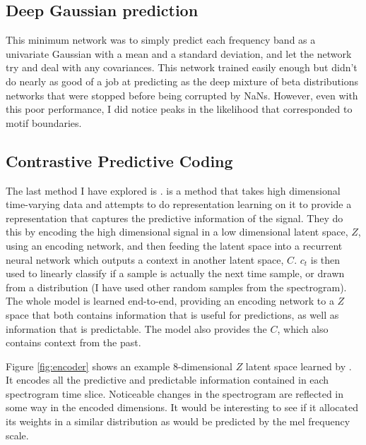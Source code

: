 \subsection{Deep Gaussian prediction}
This minimum network was to simply predict each frequency band as a univariate Gaussian with a mean and a standard deviation, and let the network try and deal with any covariances. This network trained easily enough but didn't do nearly as good of a job at predicting as the deep mixture of beta distributions networks that were stopped before being corrupted by NaNs. However, even with this poor performance, I did notice peaks in the likelihood that corresponded to motif boundaries.

\subsection{Contrastive Predictive Coding}
The last method I have explored is \CPC\cite{CPC}. \CPC is a method that takes high dimensional time-varying data and attempts to do representation learning on it to provide a representation that captures the predictive information of the signal. They do this by encoding the high dimensional signal in a low dimensional latent space, $Z$, using an encoding network, and then feeding the latent space into a recurrent neural network which outputs a context in another latent space, $C$. $c_t$ is then used to linearly classify if a sample is actually the next time sample, or drawn from a distribution (I have used other random samples from the spectrogram). The whole model is learned end-to-end, providing an encoding network to a $Z$ space that both contains information that is useful for predictions, as well as information that is predictable. The model also provides the $C$, which also contains context from the past.

Figure \ref{fig:encoder} shows an example 8-dimensional $Z$ latent space learned by \CPC. It encodes all the predictive and predictable information contained in each spectrogram time slice. Noticeable changes in the spectrogram are reflected in some way in the encoded dimensions. It would be interesting to see if it allocated its weights in a similar distribution as would be predicted by the mel frequency scale.


